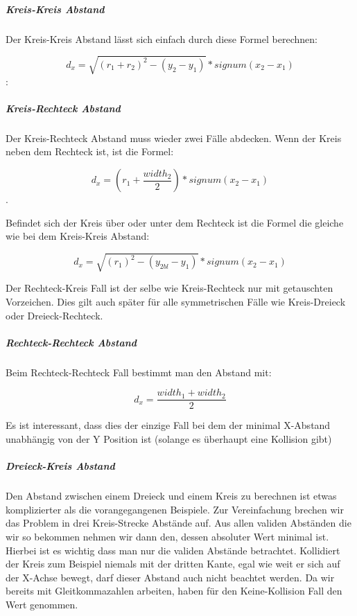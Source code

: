 \subparagraph{Kreis-Kreis Abstand}

Der Kreis-Kreis Abstand lässt sich einfach durch diese Formel berechnen:

$$d_x = \sqrt{(r_1 + r_2)^2 - (y_2 - y_1)} * signum(x_2 - x_1)$$:


\subparagraph{Kreis-Rechteck Abstand}

Der Kreis-Rechteck Abstand muss wieder zwei Fälle abdecken. Wenn der Kreis neben dem Rechteck ist, ist die Formel:

$$d_x = (r_1 + \frac{width_2}{2}) * signum(x_2 - x_1)$$. 

Befindet sich der Kreis über oder unter dem Rechteck ist die Formel die gleiche wie bei dem Kreis-Kreis Abstand:

$$d_x = \sqrt{(r_1)^2 - (y_{2bl} - y_1)} * signum(x_2 - x_1)$$


Der Rechteck-Kreis Fall ist der selbe wie Kreis-Rechteck nur mit getauschten Vorzeichen. Dies gilt auch später für alle symmetrischen Fälle wie Kreis-Dreieck oder Dreieck-Rechteck.

\subparagraph{Rechteck-Rechteck Abstand}

Beim Rechteck-Rechteck Fall bestimmt man den Abstand mit:

$$d_x = \frac{width_1 + width_2}{2}$$


Es ist interessant, dass dies der einzige Fall bei dem der minimal X-Abstand unabhängig von der Y Position ist (solange es überhaupt eine Kollision gibt)

\subparagraph{Dreieck-Kreis Abstand}

Den Abstand zwischen einem Dreieck und einem Kreis zu berechnen ist etwas komplizierter als die vorangegangenen Beispiele. Zur Vereinfachung brechen wir das Problem in drei Kreis-Strecke Abstände auf. Aus allen validen Abständen die wir so bekommen nehmen wir dann den, dessen absoluter Wert minimal ist. Hierbei ist es wichtig dass man nur die validen Abstände  betrachtet. Kollidiert der Kreis zum Beispiel niemals mit der dritten Kante, egal wie weit er sich auf der X-Achse bewegt, darf dieser Abstand auch nicht beachtet werden. 
Da wir bereits mit Gleitkommazahlen arbeiten, haben für den Keine-Kollision Fall den Wert  genommen.


